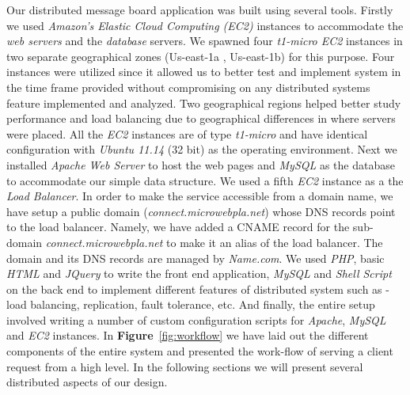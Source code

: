 \documentclass[12pt]{article}
\begin{document}
Our distributed message board application was built using several tools. Firstly we
used \emph{Amazon's Elastic Cloud Computing (EC2)} \cite{ec2} instances to
accommodate the \emph{web servers} and the \emph{database} servers. We spawned
four  \emph{t1-micro EC2} \cite{t1micro} instances in two separate geographical
zones (Us-east-1a , Us-east-1b) for this purpose. Four instances were utilized
since it allowed us to better test and implement system in the time frame
provided without compromising on any distributed systems feature implemented and
analyzed. Two geographical regions helped better study performance and load
balancing due to geographical differences in where servers were placed. All the
\emph{EC2} instances are of type \emph{t1-micro} and have identical configuration with
\emph{Ubuntu 11.14} (32 bit) as the operating environment. Next
we installed \emph{Apache Web Server} \cite{apache} to host the web pages and
\emph{MySQL} \cite{mysql} as the database to accommodate our simple data
structure. We used a fifth \emph{EC2} instance as a the \emph{Load Balancer}. In
order to make the service accessible from a domain name, we have setup a public
domain (\emph{connect.microwebpla.net}) whose DNS records point to the load balancer. 
Namely, we have added a CNAME \cite{cname} record for the sub-domain
\emph{connect.microwebpla.net} to make it an alias of the load balancer. The
domain and its DNS records are managed by \emph{Name.com}. We used \emph{PHP},
basic \emph{HTML} and \emph{JQuery} \cite{jquery} to write the front end
application, \emph{MySQL} and \emph{Shell Script} on the back end to implement
different features of distributed system such as - load balancing, replication,
fault tolerance, etc. And finally, the entire setup involved writing a number of
custom configuration scripts for \emph{Apache}, \emph{MySQL} and \emph{EC2}
instances. In  \textbf{Figure}~\ref{fig:workflow} we have laid out the different
components of the entire system and presented the work-flow of serving a client
request from a high level. In the following sections we will present several
distributed aspects of our design.
\end{document}

